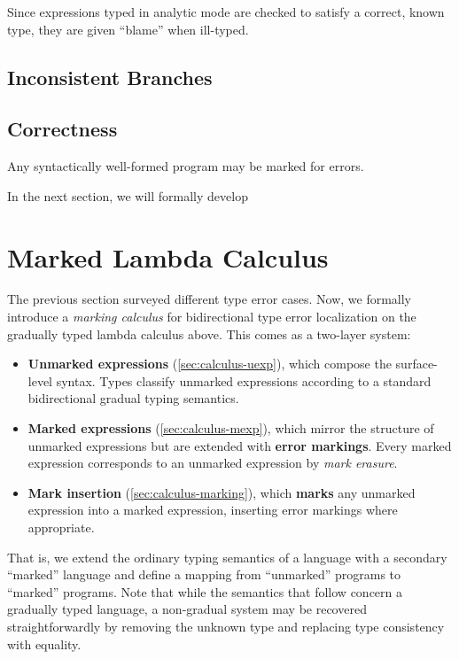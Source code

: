 


Since expressions typed in analytic mode are checked to satisfy a correct, known type, they are
given ``blame'' when ill-typed.

\subsection{Inconsistent Branches}

\subsection{Correctness}
\begin{theorem}[name=Marking Totality]
  Any syntactically well-formed program may be marked for errors.
\end{theorem}

In the next section, we will formally develop

\section{Marked Lambda Calculus}
\label{sec:calculus}

The previous section surveyed different type error cases. Now, we formally introduce a \emph{marking
calculus} for bidirectional type error localization on the gradually typed lambda calculus above.
This comes as a two-layer system:
%
\begin{itemize}
  \item \textbf{Unmarked expressions} (\cref{sec:calculus-uexp}), which compose the surface-level
    syntax. Types classify unmarked expressions according to a standard bidirectional gradual typing
    semantics.

  \item \textbf{Marked expressions} (\cref{sec:calculus-mexp}), which mirror the structure of
    unmarked expressions but are extended with \textbf{error markings}. Every marked expression
    corresponds to an unmarked expression by \emph{mark erasure}.

  \item \textbf{Mark insertion} (\cref{sec:calculus-marking}), which \textbf{marks} any unmarked expression into a marked
    expression, inserting error markings where appropriate.
\end{itemize}
%
That is, we extend the ordinary typing semantics of a language with a secondary ``marked'' language
and define a mapping from ``unmarked'' programs to ``marked'' programs. Note that while the
semantics that follow concern a gradually typed language, a non-gradual system may be recovered
straightforwardly by removing the unknown type and replacing type consistency with equality.

